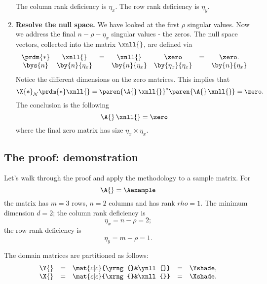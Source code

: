 \begin{enumerate}
\subitem The column rank deficiency is $\eta_{x}$.
\subitem The row rank deficiency is $\eta_{y}$.
\item \textbf{Resolve the null space.} We have looked at the first $\rho$ singular values. Now we address the final $n-\rho-\eta_{x}$ singular values - the zeros. The null space vectors, collected into the matrix $\xnll{}$, are defined via
\begin{equation}
\begin{array}{ccccccc}
  \prdm{*} & \xnll{} &=& \xnll{}&\zero &=& \zero.\\
  \bys{n}  & \by{n}{\eta_{x}}    && \by{n}{\eta_{x}} & \by{\eta_{x}}{\eta_{x}} && \by{n}{\eta_{x}}
\end{array}
\end{equation}
\subitem Notice the different dimensions on the zero matrices.
This implies that
\begin{equation}
  \X{*}_{\mathcal{N}}\prdm{*}\xnll{} = \paren{\A{}\,\xnll{}}^{*}\paren{\A{}\,\xnll{}} = \zero.
\end{equation}
The conclusion is the following
\begin{equation}
  \A{}\,\xnll{} = \zero
\end{equation}
where the final zero matrix has size $\eta_{x}\times \eta_{x}$.
\end{enumerate}

\subsection{The proof: demonstration}
Let's walk through the proof and apply the methodology to a sample matrix. For 
\begin{equation}
  \A{} = \Aexample
\end{equation}
the matrix has $m=3$ rows, $n=2$ columns and has rank $rho=1$. The minimum dimension $d=2$; the column rank deficiency is
\begin{equation}
  \eta_{x} = n - \rho = 2;
\end{equation}
the row rank deficiency is
\begin{equation}
  \eta_{y} = m - \rho = 1.
\end{equation}

The domain matrices are partitioned as follows:
\begin{equation}
  \begin{array}{lcccl}
    \Y{} &=& \mat{c|c}{\yrng{}&\ynll{}} &=& \Yshade, \\
    \X{} &=& \mat{c|c}{\xrng{}&\xnll{}} &=& \Xshade.
  \end{array}
\end{equation}

